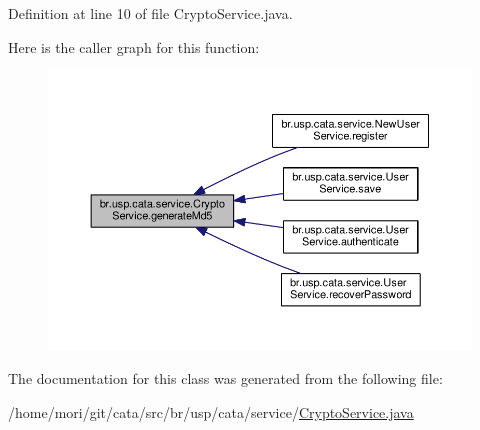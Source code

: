 Definition at line 10 of file Crypto\+Service.\+java.



Here is the caller graph for this function\+:\nopagebreak
\begin{figure}[H]
\begin{center}
\leavevmode
\includegraphics[width=350pt]{classbr_1_1usp_1_1cata_1_1service_1_1_crypto_service_a2941595185b39d654bcba055ef8467e6_icgraph}
\end{center}
\end{figure}




The documentation for this class was generated from the following file\+:\begin{DoxyCompactItemize}
\item 
/home/mori/git/cata/src/br/usp/cata/service/\hyperlink{_crypto_service_8java}{Crypto\+Service.\+java}\end{DoxyCompactItemize}
